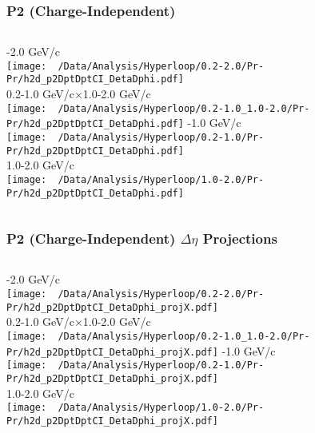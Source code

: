 \documentclass{beamer}
\begin{document}
\begin{frame}
	\frametitle{P2 (Charge-Independent)}
	\begin{columns}
		-2.0 GeV/c\\
		\texttt{[image: ~/Data/Analysis/Hyperloop/0.2-2.0/Pr-Pr/h2d\_p2DptDptCI\_DetaDphi.pdf]}\\0.2-1.0 GeV/c$\times$1.0-2.0 GeV/c\\
		\texttt{[image: ~/Data/Analysis/Hyperloop/0.2-1.0\_1.0-2.0/Pr-Pr/h2d\_p2DptDptCI\_DetaDphi.pdf]}
		-1.0 GeV/c\\
		\texttt{[image: ~/Data/Analysis/Hyperloop/0.2-1.0/Pr-Pr/h2d\_p2DptDptCI\_DetaDphi.pdf]}\\1.0-2.0 GeV/c\\
		\texttt{[image: ~/Data/Analysis/Hyperloop/1.0-2.0/Pr-Pr/h2d\_p2DptDptCI\_DetaDphi.pdf]}
	\end{columns}
\end{frame}
\begin{frame}
	\frametitle{P2 (Charge-Independent) $\Delta\eta$ Projections}
	\begin{columns}
		\column{0.5\textwidth}
		-2.0 GeV/c\\
		\texttt{[image: ~/Data/Analysis/Hyperloop/0.2-2.0/Pr-Pr/h2d\_p2DptDptCI\_DetaDphi\_projX.pdf]}\\0.2-1.0 GeV/c$\times$1.0-2.0 GeV/c\\
		\texttt{[image: ~/Data/Analysis/Hyperloop/0.2-1.0\_1.0-2.0/Pr-Pr/h2d\_p2DptDptCI\_DetaDphi\_projX.pdf]}
		\column{0.5\textwidth}
		-1.0 GeV/c\\
		\texttt{[image: ~/Data/Analysis/Hyperloop/0.2-1.0/Pr-Pr/h2d\_p2DptDptCI\_DetaDphi\_projX.pdf]}\\1.0-2.0 GeV/c\\
		\texttt{[image: ~/Data/Analysis/Hyperloop/1.0-2.0/Pr-Pr/h2d\_p2DptDptCI\_DetaDphi\_projX.pdf]}
	\end{columns}
\end{frame}
\end{document}
